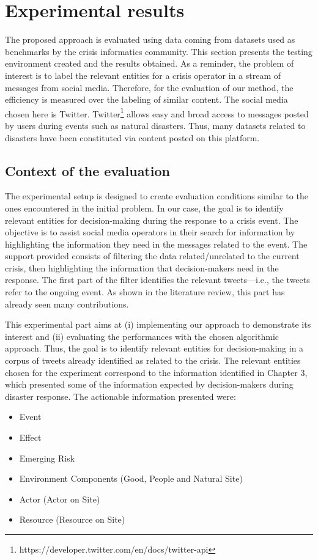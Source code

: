\section{Experimental results}
The proposed approach is evaluated using data coming from datasets used as benchmarks
by the crisis informatics community.
This section presents the testing environment created and the results obtained.
As a reminder, the problem of interest is to label the relevant entities for a crisis operator in a stream of messages from social media.
Therefore, for the evaluation of our method, the efficiency is measured over the labeling of similar content.
The social media chosen here is Twitter.
Twitter\footnote{https://developer.twitter.com/en/docs/twitter-api} allows easy and broad access to messages posted by users during events such as natural disasters.
Thus, many datasets related to disasters have been constituted via content posted on this platform.

\subsection{Context of the evaluation}
The experimental setup is designed to create evaluation conditions similar to the ones encountered in the initial problem.
In our case, the goal is to identify relevant entities for decision-making during the response to a crisis event.
The objective is to assist social media operators in their search for information by highlighting the information they need in the messages related to the event.
The support provided consists of filtering the data related/unrelated to the current crisis, then highlighting the information that decision-makers need in the response.
The first part of the filter identifies the relevant tweets—i.e., the tweets refer to the ongoing event.
As shown in the literature review, this part has already seen many contributions.

This experimental part aims at (i) implementing our approach to demonstrate its interest and (ii) evaluating the performances with the chosen algorithmic approach.
Thus, the goal is to identify relevant entities for decision-making in a corpus of tweets already identified as related to the crisis.
The relevant entities chosen for the experiment correspond to the information identified in Chapter 3, which presented some of the information expected by decision-makers during disaster response.
The actionable information presented were:

\begin{itemize}
    \item Event
    \item Effect
    \item Emerging Risk
    \item Environment Components (Good, People and Natural Site)
    \item Actor (Actor on Site)
    \item Resource (Resource on Site)
\end{itemize}

